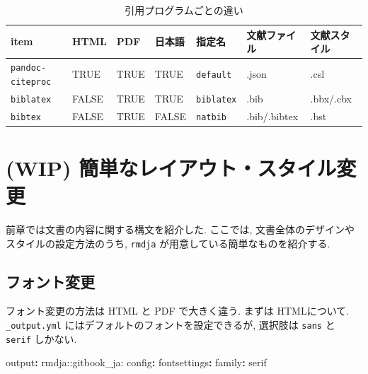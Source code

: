 \documentclass[
]{bxjsbook}
\newenvironment{Shaded}{\begin{snugshade}}{\end{snugshade}}
\newcommand{\AttributeTok}[1]{\textcolor[rgb]{0.77,0.63,0.00}{#1}}
\newcommand{\FunctionTok}[1]{\textcolor[rgb]{0.00,0.00,0.00}{#1}}
\newcommand{\KeywordTok}[1]{\textcolor[rgb]{0.13,0.29,0.53}{\textbf{#1}}}
\theoremstyle{definition}
\theoremstyle{definition}
\theoremstyle{definition}
\theoremstyle{remark}
\begin{document}
\begin{table}

\caption{\label{tab:biblio-comparison}引用プログラムごとの違い}
\centering
\begin{tabular}[t]{lllllll}
\toprule
item & HTML & PDF & 日本語 & 指定名 & 文献ファイル & 文献スタイル\\
\midrule
\texttt{pandoc-citeproc} & TRUE & TRUE & TRUE & \texttt{default} & .json & .csl\\
\texttt{biblatex} & FALSE & TRUE & TRUE & \texttt{biblatex} & .bib & .bbx/.cbx\\
\texttt{bibtex} & FALSE & TRUE & FALSE & \texttt{natbib} & .bib/.bibtex & .bst\\
\bottomrule
\end{tabular}
\end{table}

\hypertarget{wip-ux7c21ux5358ux306aux30ecux30a4ux30a2ux30a6ux30c8ux30b9ux30bfux30a4ux30ebux5909ux66f4}{%
\chapter{(WIP)
簡単なレイアウト・スタイル変更}\label{wip-ux7c21ux5358ux306aux30ecux30a4ux30a2ux30a6ux30c8ux30b9ux30bfux30a4ux30ebux5909ux66f4}}

前章では文書の内容に関する構文を紹介した. ここでは,
文書全体のデザインやスタイルの設定方法のうち, \texttt{rmdja}
が用意している簡単なものを紹介する.

\hypertarget{ux30d5ux30a9ux30f3ux30c8ux5909ux66f4}{%
\section{フォント変更}\label{ux30d5ux30a9ux30f3ux30c8ux5909ux66f4}}

フォント変更の方法は HTML と PDF で大きく違う. まずは HTMLについて.
\texttt{\_output.yml} にはデフォルトのフォントを設定できるが, 選択肢は
\texttt{sans} と \texttt{serif} しかない.

\begin{Shaded}
\begin{Highlighting}[]
\FunctionTok{output}\KeywordTok{:}\AttributeTok{ rmdja::gitbook\_ja:}
\AttributeTok{  }\FunctionTok{config}\KeywordTok{:}
\AttributeTok{    }\FunctionTok{fontsettings}\KeywordTok{:}
\AttributeTok{      }\FunctionTok{family}\KeywordTok{:}\AttributeTok{ serif}
\end{Highlighting}
\end{Shaded}
\end{document}
